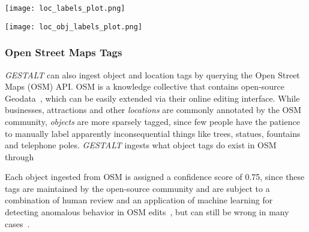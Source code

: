

\begin{figure*}[ht]       
    \texttt{[image: loc\_labels\_plot.png]}
    \centering
    \caption[width=\textwidth]{............}
    \label{fig:loc} 
\end{figure*}


\begin{figure*}[ht]
    \texttt{[image: loc\_obj\_labels\_plot.png]}
    \centering
    \caption[width=\textwidth]{............}
    \label{fig:loc-obj}  
\end{figure*}


\subsubsection{Open Street Maps Tags}
\emph{GESTALT} can also ingest object and location tags by querying the Open Street Maps (OSM) API.
OSM is a knowledge collective that contains open-source Geodata~\cite{Haklay2008}, which can be easily extended via their online editing interface.
While businesses, attractions and other \textit{locations} are commonly annotated by the OSM community, \textit{objects} are more sparsely tagged, since few people have the patience to manually label apparently inconsequential things like trees, statues, fountains and telephone poles. 
\emph{GESTALT} ingests what object tags do exist in OSM through 


Each object ingested from OSM is assigned a confidence score of 0.75, since these tags are maintained by the open-source community and are subject to a combination of human review and an application of machine learning for detecting anomalous behavior in OSM edits~\cite{Mooney2017}, but can still be wrong in many cases~\cite{VargasMunoz2020}.


